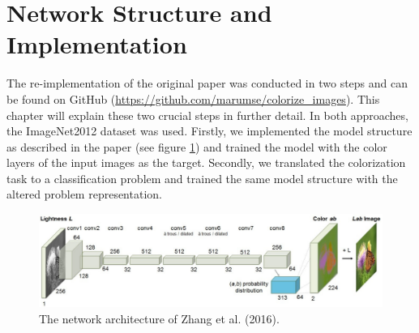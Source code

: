 \documentclass[12pt,letterpaper]{article}
\begin{document}
\section{Network Structure and Implementation}
The re-implementation of the original paper \citep{Zhang.2016} was conducted in two steps and can be found on GitHub (\url{https://github.com/marumse/colorize_images}). This chapter will explain these two crucial steps in further detail. In both approaches, the ImageNet2012 dataset was used. Firstly, we implemented the model structure as described in the paper (see figure \ref{network}) and trained the model with the color layers of the input images as the target. Secondly, we translated the colorization task to a classification problem and trained the same model structure with the altered problem representation.
\begin{figure}[hb]
	\centering
	\includegraphics[width=1.0\textwidth]{layer.png}
	\caption{The network architecture of Zhang et al. (2016). }
	\label{network}
\end{figure}
\end{document}

